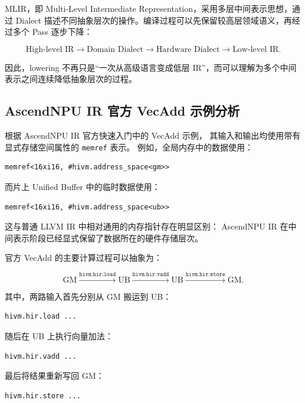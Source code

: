 \documentclass[12pt,a4paper]{ctexart}
\begin{document}
MLIR，即 Multi-Level Intermediate Representation，采用多层中间表示思想，通过 Dialect 描述不同抽象层次的操作。编译过程可以先保留较高层领域语义，再经过多个 Pass 逐步下降：

\[
\text{High-level IR}
\rightarrow
\text{Domain Dialect}
\rightarrow
\text{Hardware Dialect}
\rightarrow
\text{Low-level IR}.
\]

因此，lowering 不再只是“一次从高级语言变成低层 IR”，而可以理解为多个中间表示之间连续降低抽象层次的过程。

\subsection{AscendNPU IR 官方 VecAdd 示例分析}

根据 AscendNPU IR 官方快速入门中的 VecAdd 示例，
其输入和输出均使用带有显式存储空间属性的 \texttt{memref} 表示。
例如，全局内存中的数据使用：

\begin{lstlisting}
memref<16xi16, #hivm.address_space<gm>>
\end{lstlisting}

而片上 Unified Buffer 中的临时数据使用：

\begin{lstlisting}
memref<16xi16, #hivm.address_space<ub>>
\end{lstlisting}

这与普通 LLVM IR 中相对通用的内存指针存在明显区别：
AscendNPU IR 在中间表示阶段已经显式保留了数据所在的硬件存储层次。

官方 VecAdd 的主要计算过程可以抽象为：

\[
\mathrm{GM}
\overset{\texttt{hivm.hir.load}}{\longrightarrow}
\mathrm{UB}
\overset{\texttt{hivm.hir.vadd}}{\longrightarrow}
\mathrm{UB}
\overset{\texttt{hivm.hir.store}}{\longrightarrow}
\mathrm{GM}.
\]

其中，两路输入首先分别从 GM 搬运到 UB：

\begin{lstlisting}
hivm.hir.load ...
\end{lstlisting}

随后在 UB 上执行向量加法：

\begin{lstlisting}
hivm.hir.vadd ...
\end{lstlisting}

最后将结果重新写回 GM：

\begin{lstlisting}
hivm.hir.store ...
\end{lstlisting}
\end{document}
